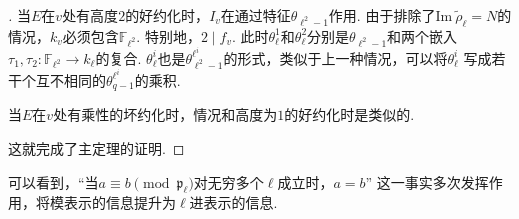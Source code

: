 \begin{proof}[]
    当$E$在$v$处有高度$2$的好约化时，$I_v$在通过特征$\theta_{\ell^2-1}$作用. 由于排除了$\mathrm{Im}\ \tilde{\rho}_{\ell} = N$的情况，$k_v$必须包含$\mathbb{F}_{\ell^2}$. 特别地，$2\mid f_v$.
    此时$\theta_{\ell}^1$和$\theta_{\ell}^2$分别是$\theta_{\ell^2-1}$和两个嵌入$\tau_1,\tau_2:\mathbb{F}_{\ell^2}\to k_{\ell}$的复合.
    $\theta_{\ell}^{i}$也是$\theta_{\ell^2 - 1}^{\ell^i}$的形式，类似于上一种情况，可以将$\theta_{\ell}^{i}$
    写成若干个互不相同的$\theta_{q-1}^{\ell^i}$的乘积.

    当$E$在$v$处有乘性的坏约化时，情况和高度为$1$的好约化时是类似的.

    这就完成了主定理的证明.
\end{proof}

\begin{crem}
    可以看到，“当$a\equiv b\pmod{\mathfrak{p}_{\ell}}$对无穷多个$\ell$成立时，$a=b$”
    这一事实多次发挥作用，将模表示的信息提升为$\ell$进表示的信息.
\end{crem}
